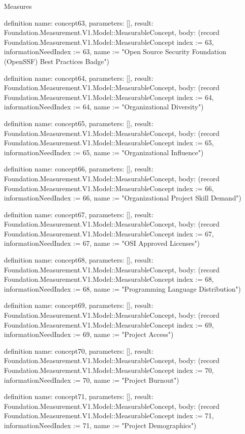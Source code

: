 \begin{lexlean}{Measures}
\begin{semanticmodule}
definition{
  name: concept63,
  parameters: [],
  result: Foundation.Measurement.V1.Model::MeasurableConcept,
  body: (record Foundation.Measurement.V1.Model::MeasurableConcept {index := 63, informationNeedIndex := 63, name := "Open Source Security Foundation (OpenSSF) Best Practices Badge"})
}

definition{
  name: concept64,
  parameters: [],
  result: Foundation.Measurement.V1.Model::MeasurableConcept,
  body: (record Foundation.Measurement.V1.Model::MeasurableConcept {index := 64, informationNeedIndex := 64, name := "Organizational Diversity"})
}

definition{
  name: concept65,
  parameters: [],
  result: Foundation.Measurement.V1.Model::MeasurableConcept,
  body: (record Foundation.Measurement.V1.Model::MeasurableConcept {index := 65, informationNeedIndex := 65, name := "Organizational Influence"})
}

definition{
  name: concept66,
  parameters: [],
  result: Foundation.Measurement.V1.Model::MeasurableConcept,
  body: (record Foundation.Measurement.V1.Model::MeasurableConcept {index := 66, informationNeedIndex := 66, name := "Organizational Project Skill Demand"})
}

definition{
  name: concept67,
  parameters: [],
  result: Foundation.Measurement.V1.Model::MeasurableConcept,
  body: (record Foundation.Measurement.V1.Model::MeasurableConcept {index := 67, informationNeedIndex := 67, name := "OSI Approved Licenses"})
}

definition{
  name: concept68,
  parameters: [],
  result: Foundation.Measurement.V1.Model::MeasurableConcept,
  body: (record Foundation.Measurement.V1.Model::MeasurableConcept {index := 68, informationNeedIndex := 68, name := "Programming Language Distribution"})
}

definition{
  name: concept69,
  parameters: [],
  result: Foundation.Measurement.V1.Model::MeasurableConcept,
  body: (record Foundation.Measurement.V1.Model::MeasurableConcept {index := 69, informationNeedIndex := 69, name := "Project Access"})
}

definition{
  name: concept70,
  parameters: [],
  result: Foundation.Measurement.V1.Model::MeasurableConcept,
  body: (record Foundation.Measurement.V1.Model::MeasurableConcept {index := 70, informationNeedIndex := 70, name := "Project Burnout"})
}

definition{
  name: concept71,
  parameters: [],
  result: Foundation.Measurement.V1.Model::MeasurableConcept,
  body: (record Foundation.Measurement.V1.Model::MeasurableConcept {index := 71, informationNeedIndex := 71, name := "Project Demographics"})
}


\end{semanticmodule}
\end{lexlean}
